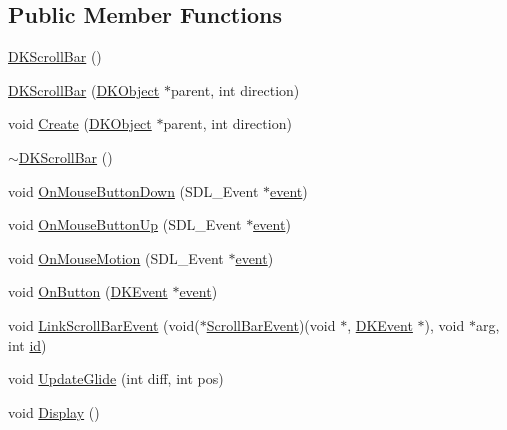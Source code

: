 \subsection*{Public Member Functions}
\begin{DoxyCompactItemize}
\item 
\hyperlink{class_d_k_scroll_bar_a56ecab0550b5211248c49cfc24ef149f}{D\-K\-Scroll\-Bar} ()
\item 
\hyperlink{class_d_k_scroll_bar_a89dbc744bde81fb727d51272a30bc133}{D\-K\-Scroll\-Bar} (\hyperlink{class_d_k_object}{D\-K\-Object} $\ast$parent, int direction)
\item 
void \hyperlink{class_d_k_scroll_bar_ab89f22f91f7aaa48337df6cae2c7ed55}{Create} (\hyperlink{class_d_k_object}{D\-K\-Object} $\ast$parent, int direction)
\item 
\hyperlink{class_d_k_scroll_bar_abd9902fa8300c7b5a303871fb30b9f30}{$\sim$\-D\-K\-Scroll\-Bar} ()
\item 
void \hyperlink{class_d_k_scroll_bar_a382eec015aeb9fcbefc1fefd0d756c05}{On\-Mouse\-Button\-Down} (S\-D\-L\-\_\-\-Event $\ast$\hyperlink{class_d_k_event_a3deebb932ed734363c4ece87971bc45f}{event})
\item 
void \hyperlink{class_d_k_scroll_bar_a02973917e863eccc190351eae44e4585}{On\-Mouse\-Button\-Up} (S\-D\-L\-\_\-\-Event $\ast$\hyperlink{class_d_k_event_a3deebb932ed734363c4ece87971bc45f}{event})
\item 
void \hyperlink{class_d_k_scroll_bar_aa8b343daaf38b6b3dc74d930eb7390dd}{On\-Mouse\-Motion} (S\-D\-L\-\_\-\-Event $\ast$\hyperlink{class_d_k_event_a3deebb932ed734363c4ece87971bc45f}{event})
\item 
void \hyperlink{class_d_k_scroll_bar_a259c1c2fdbd9de15e5c695de06a02d12}{On\-Button} (\hyperlink{class_d_k_event}{D\-K\-Event} $\ast$\hyperlink{class_d_k_event_a3deebb932ed734363c4ece87971bc45f}{event})
\item 
void \hyperlink{class_d_k_scroll_bar_a6a0f64ea1fe8f3794f5d141300e7de9b}{Link\-Scroll\-Bar\-Event} (void($\ast$\hyperlink{class_d_k_event_a87ec7bf5f444b050e71b61d547c44db2}{Scroll\-Bar\-Event})(void $\ast$, \hyperlink{class_d_k_event}{D\-K\-Event} $\ast$), void $\ast$arg, int \hyperlink{class_d_k_event_a46877918e12fcb3b2c8988379b6fa6fa}{id})
\item 
void \hyperlink{class_d_k_scroll_bar_ac59ee1adea17cd3b3336273379716cf3}{Update\-Glide} (int diff, int pos)
\item 
void \hyperlink{class_d_k_scroll_bar_a4dd77e37e0fb41bb619e151dbdc4e44c}{Display} ()
\end{DoxyCompactItemize}
